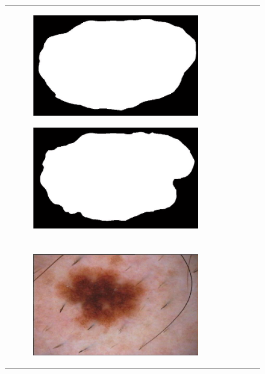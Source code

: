 \documentclass[a4paper, 10pt, conference]{ieeeconf}        %
\begin{document}
\begin{figure}[ht!]
\begin{tabular}{c c c c c}
\begin{subfigure}{0.2\textwidth}
  \end{subfigure} 
 \begin{subfigure}{0.2\textwidth}
  \includegraphics[scale=0.2]{expert_3GroundTrue_01.JPG}
  \end{subfigure} 
 \begin{subfigure}{0.2\textwidth}
  \includegraphics[scale=0.2]{finalGroundTrue_01.JPG}
  \end{subfigure} \\ \\
   \begin{subfigure}{0.2\textwidth}
   \includegraphics[scale=0.15]{original02.JPG}

\end{subfigure}
\end{tabular}
\end{figure}
\end{document}
